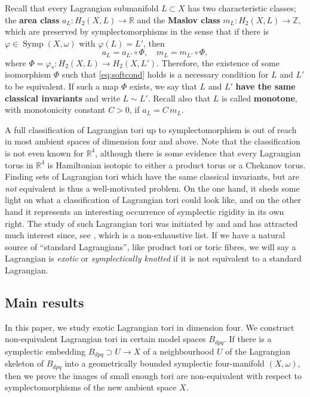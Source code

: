 \documentclass[AIF,Unicode,manuscript]{cedram}
\begin{document}
Recall that every Lagrangian submanifold $L \subset X$ has two characteristic classes; the  \textbf{area class} $a_L \colon H_2(X,L) \rightarrow \mathbb{R}$ and the \textbf{Maslov class} $m_L \colon H_2(X,L) \rightarrow \mathbb{Z}$, which are preserved by symplectomorphisms in the sense that if there is $φ \in \operatorname{Symp}(X,\omega)$ with $φ(L) = L'$, then 
\begin{equation}
    \label{eq:softcond}
    a_{L} = a_{L'} \circ Φ, \quad
    m_{L} = m_{L'} \circ Φ, 
\end{equation}
where $Φ = φ_* \colon H_2(X,L) \rightarrow H_2(X,L')$.
Therefore, the existence of some isomorphism $Φ$ such that \eqref{eq:softcond} holds is a necessary condition for $L$ and $L'$ to be equivalent.
If such a map $Φ$ exists, we say that $L$ and $L'$ \textbf{have the same classical invariants} and write $L \sim L'$.
Recall also that $L$ is called \textbf{monotone}, with monotonicity constant $C > 0$, if $a_L = C \, m_L$. 

A full classification of Lagrangian tori up to symplectomorphism is out of reach in most ambient spaces of dimension four and above.
Note that the classification is not even known for $\mathbb{R}^4$, although there is some evidence \cite{Riz19} that every Lagrangian torus in $\mathbb{R}^4$ is Hamiltonian isotopic to either a product torus or a Chekanov torus.
Finding sets of Lagrangian tori which have the same classical invariants, but are \emph{not} equivalent is thus a well-motivated problem.
On the one hand, it sheds some light on what a classification of Lagrangian tori could look like, and on the other hand it represents an interesting occurrence of symplectic rigidity in its own right.
The study of such Lagrangian tori was initiated by \cite{Che96} and \cite{EliPol97} and has attracted much interest since,  see \cite{Aur15, brendel2020real, CheSch10, FOOO12, GalMik22, SheTonVia19, Via17, Via16} , which is a non-exhaustive list.
If we have a natural source of ``standard Lagrangians'', like product tori or
toric fibres, we will say a Lagrangian is \emph{exotic} or \emph{symplectically knotted} if it is not equivalent to a standard Lagrangian.

\subsection{Main results}
\label{sec:intro_main_results}

In this paper, we study exotic Lagrangian tori in dimension four.
We construct non-equivalent Lagrangian tori in certain model spaces $B_{dpq}$. If there is a symplectic embedding $B_{dpq} \supset U \rightarrow X$ of a neighbourhood $U$ of the Lagrangian skeleton of $B_{dpq}$ into a geometrically bounded symplectic four-manifold $(X,\omega)$, then we prove the images of small enough tori are non-equivalent with respect to symplectomorphisms of the new ambient space $X$.
\end{document}
